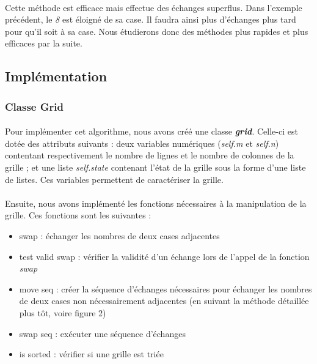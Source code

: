 \documentclass[12pt]{article}
\begin{document}
\justifying \paragraph{}
Cette méthode est efficace mais effectue des échanges superflus. Dans l'exemple précédent, le \textit{8} est éloigné de sa case. Il faudra ainsi plus d'échanges plus tard pour qu'il soit à sa case. Nous étudierons donc des méthodes plus rapides et plus efficaces par la suite.

\subsection{Implémentation}
\subsubsection{Classe Grid}

\paragraph{}
Pour implémenter cet algorithme, nous avons créé une classe \textbf{\textit{grid}}. Celle-ci est dotée des attributs suivants : deux variables numériques (\textit{self.m} et \textit{self.n}) contentant respectivement le nombre de lignes et le nombre de colonnes de la grille ; et une liste \textit{self.state} contenant l'état de la grille sous la forme d'une liste de listes. Ces variables permettent de caractériser la grille.

\paragraph{}
Ensuite, nous avons implémenté les fonctions nécessaires à la manipulation de la grille. Ces fonctions sont les suivantes :
\begin{itemize}
    \item swap : échanger les nombres de deux cases adjacentes \
    \item test valid swap : vérifier la validité d'un échange lors de l'appel de la fonction \textit{swap} \
    \item move seq : créer la séquence d'échanges nécessaires pour échanger les nombres de deux cases non nécessairement adjacentes (en suivant la méthode détaillée plus tôt, voire figure 2)\
    \item swap seq : exécuter une séquence d'échanges\
    \item is sorted : vérifier si une grille est triée \
\end{itemize}
\end{document}
